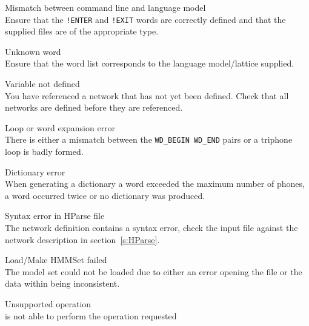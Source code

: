 \begin{itemize}

\begin{itemize}
 Mismatch between command line and language model\\
        Ensure that the \texttt{!ENTER} and \texttt{!EXIT} words are correctly 
        defined and that the supplied files are of the appropriate type.

 Unknown word\\
        Ensure that the word list corresponds to the language model/lattice
        supplied.

\end{itemize}


\begin{itemize}
 Variable not defined\\
        You have referenced a network that has not yet been defined.  Check 
        that all networks are defined before they are referenced.

 Loop or word expansion error\\
        There is either a mismatch between the \texttt{WD\_BEGIN WD\_END} 
        pairs or a triphone loop is badly formed.

 Dictionary error\\
        When generating a dictionary a word exceeded the maximum number of 
        phones, a word occurred twice or no dictionary was produced.

 Syntax error in HParse file\\
        The  network definition contains a syntax error, check 
        the input file against the network description in 
        section~\ref{s:HParse}.

\end{itemize}


\begin{itemize}

    Load/Make HMMSet failed\\
        The model set could not be loaded due to either an error opening the
        file or the data within being inconsistent.

 Unsupported operation\\
         is not able to perform the operation requested


\end{itemize}
\end{itemize}
